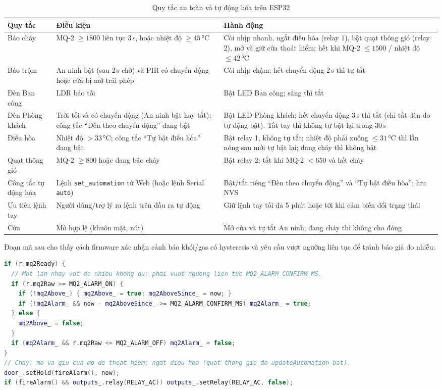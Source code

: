 \documentclass[12pt,a4paper]{extarticle}
\newcommand{\hang}{}  %
\begin{document}
\begin{table}[H]
\centering
\begin{tabularx}{\linewidth}{|p{3.3cm}|p{4.6cm}|L|}
\hline
\hang \textbf{Quy tắc} & \textbf{Điều kiện} & \textbf{Hành động} \\ \hline
Báo cháy & MQ-2 $\ge 1800$ liên tục 3\,s, hoặc nhiệt độ $\ge 45$\,°C & Còi nhịp nhanh, ngắt điều hòa (relay 1), bật quạt thông gió (relay 2), mở và giữ cửa thoát hiểm; hết khi MQ-2 $\le 1500$ / nhiệt độ $\le 42$\,°C \\ \hline
Báo trộm & An ninh bật (sau 2\,s chờ) và PIR có chuyển động hoặc cửa bị mở trái phép & Còi nhịp chậm; hết chuyển động 2\,s thì tự tắt \\ \hline
Đèn Ban công & LDR báo tối & Bật LED Ban công; sáng thì tắt \\ \hline
Đèn Phòng khách & Trời tối và có chuyển động (An ninh bật hay tắt); công tắc ``Đèn theo chuyển động'' đang bật & Bật LED Phòng khách; hết chuyển động 3\,s thì tắt (chỉ tắt đèn do tự động bật). Tắt tay thì không tự bật lại trong 30\,s \\ \hline
Điều hòa & Nhiệt độ $> 33$\,°C; công tắc ``Tự bật điều hòa'' đang bật & Bật relay 1, không tự tắt; nhiệt độ phải xuống $\le 31$\,°C thì lần nóng sau mới tự bật lại; đang cháy thì không bật \\ \hline
Quạt thông gió & MQ-2 $\ge 800$ hoặc đang báo cháy & Bật relay 2; tắt khi MQ-2 $< 650$ và hết cháy \\ \hline
Công tắc tự động hóa & Lệnh \texttt{set\_automation} từ Web (hoặc lệnh Serial \texttt{auto}) & Bật/tắt riêng ``Đèn theo chuyển động'' và ``Tự bật điều hòa''; lưu NVS \\ \hline
Ưu tiên lệnh tay & Người dùng/trợ lý ra lệnh trên đầu ra tự động & Giữ lệnh tay tối đa 5 phút hoặc tới khi cảm biến đổi trạng thái \\ \hline
Cửa & Mở hợp lệ (khuôn mặt, nút) & Mở cửa và tự tắt An ninh; đang cháy thì không cho đóng \\ \hline
\end{tabularx}
\caption{Quy tắc an toàn và tự động hóa trên ESP32}
\label{tab:quytac}
\end{table}

Đoạn mã sau cho thấy cách firmware xác nhận cảnh báo khói/gas có hysteresis và yêu cầu vượt ngưỡng liên tục để tránh báo giả do nhiễu:

\begin{lstlisting}[language=C++]
if (r.mq2Ready) {
  // Mot lan nhay vot do nhieu khong du: phai vuot nguong lien tuc MQ2_ALARM_CONFIRM_MS.
  if (r.mq2Raw >= MQ2_ALARM_ON) {
    if (!mq2Above_) { mq2Above_ = true; mq2AboveSince_ = now; }
    if (!mq2Alarm_ && now - mq2AboveSince_ >= MQ2_ALARM_CONFIRM_MS) mq2Alarm_ = true;
  } else {
    mq2Above_ = false;
  }
  if (mq2Alarm_ && r.mq2Raw <= MQ2_ALARM_OFF) mq2Alarm_ = false;
}
// Chay: mo va giu cua mo de thoat hiem; ngat dieu hoa (quat thong gio do updateAutomation bat).
door_.setHold(fireAlarm(), now);
if (fireAlarm() && outputs_.relay(RELAY_AC)) outputs_.setRelay(RELAY_AC, false);
\end{lstlisting}
\end{document}

